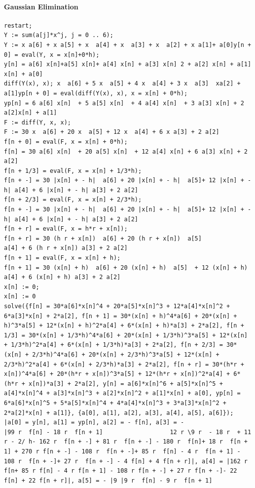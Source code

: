 \documentclass[12pt]{report}
\begin{document}
\paragraph{Gaussian Elimination}
\begin{verbatim}
restart;
Y := sum(a[j]*x^j, j = 0 .. 6);              
Y := x a[6] + x a[5] + x  a[4] + x  a[3] + x  a[2] + x a[1]+ a[0]y[n + 0] = eval(Y, x = x[n]+0*h);
y[n] = a[6] x[n]+a[5] x[n]+ a[4] x[n] + a[3] x[n] 2 + a[2] x[n] + a[1] x[n] + a[0]
diff(Y(x), x); x  a[6] + 5 x  a[5] + 4 x  a[4] + 3 x  a[3]  xa[2] + a[1]yp[n + 0] = eval(diff(Y(x), x), x = x[n] + 0*h);
yp[n] = 6 a[6] x[n]  + 5 a[5] x[n]  + 4 a[4] x[n]  + 3 a[3] x[n] + 2 a[2]x[n] + a[1]
F := diff(Y, x, x);                      
F := 30 x  a[6] + 20 x  a[5] + 12 x  a[4] + 6 x a[3] + 2 a[2]
f[n + 0] = eval(F, x = x[n] + 0*h);
f[n] = 30 a[6] x[n]  + 20 a[5] x[n]  + 12 a[4] x[n] + 6 a[3] x[n] + 2 a[2]
f[n + 1/3] = eval(F, x = x[n] + 1/3*h);  
f[n + -] = 30 |x[n] + - h|  a[6] + 20 |x[n] + - h|  a[5]+ 12 |x[n] + - h| a[4] + 6 |x[n] + - h| a[3] + 2 a[2]            
f[n + 2/3] = eval(F, x = x[n] + 2/3*h);      
f[n + -] = 30 |x[n] + - h|  a[6] + 20 |x[n] + - h|  a[5]+ 12 |x[n] + - h| a[4] + 6 |x[n] + - h| a[3] + 2 a[2]    
f[n + r] = eval(F, x = h*r + x[n]);
f[n + r] = 30 (h r + x[n])  a[6] + 20 (h r + x[n])  a[5]
a[4] + 6 (h r + x[n]) a[3] + 2 a[2]
f[n + 1] = eval(F, x = x[n] + h);   
f[n + 1] = 30 (x[n] + h)  a[6] + 20 (x[n] + h)  a[5]  + 12 (x[n] + h)  a[4] + 6 (x[n] + h) a[3] + 2 a[2]
x[n] := 0;
x[n] := 0
solve({f[n] = 30*a[6]*x[n]^4 + 20*a[5]*x[n]^3 + 12*a[4]*x[n]^2 + 6*a[3]*x[n] + 2*a[2], f[n + 1] = 30*(x[n] + h)^4*a[6] + 20*(x[n] + h)^3*a[5] + 12*(x[n] + h)^2*a[4] + 6*(x[n] + h)*a[3] + 2*a[2], f[n + 1/3] = 30*(x[n] + 1/3*h)^4*a[6] + 20*(x[n] + 1/3*h)^3*a[5] + 12*(x[n] + 1/3*h)^2*a[4] + 6*(x[n] + 1/3*h)*a[3] + 2*a[2], f[n + 2/3] = 30*(x[n] + 2/3*h)^4*a[6] + 20*(x[n] + 2/3*h)^3*a[5] + 12*(x[n] + 2/3*h)^2*a[4] + 6*(x[n] + 2/3*h)*a[3] + 2*a[2], f[n + r] = 30*(h*r + x[n])^4*a[6] + 20*(h*r + x[n])^3*a[5] + 12*(h*r + x[n])^2*a[4] + 6*(h*r + x[n])*a[3] + 2*a[2], y[n] = a[6]*x[n]^6 + a[5]*x[n]^5 + a[4]*x[n]^4 + a[3]*x[n]^3 + a[2]*x[n]^2 + a[1]*x[n] + a[0], yp[n] = 6*a[6]*x[n]^5 + 5*a[5]*x[n]^4 + 4*a[4]*x[n]^3 + 3*a[3]*x[n]^2 + 2*a[2]*x[n] + a[1]}, {a[0], a[1], a[2], a[3], a[4], a[5], a[6]});   
|a[0] = y[n], a[1] = yp[n], a[2] = - f[n], a[3] = -    
|99 r  f[n] - 18 r  f[n + 1]                   12 r \9 r  - 18 r  + 11 r - 2/ h- 162 r  f[n + -] + 81 r  f[n + -] - 180 r  f[n]+ 18 r  f[n + 1] + 270 r f[n + -] - 108 r  f[n + -]+ 85 r  f[n] - 4 r  f[n + 1] - 108 r  f[n + -]+ 27 r  f[n + -] - 4 f[n] + 4 f[n + r]|, a[4] = |162 r  f[n+ 85 r f[n] - 4 r f[n + 1] - 108 r f[n + -] + 27 r f[n + -]- 22 f[n] + 22 f[n + r]|, a[5] = - |9 |9 r  f[n] - 9 r  f[n + 1]                     

\end{verbatim}
\end{document}
